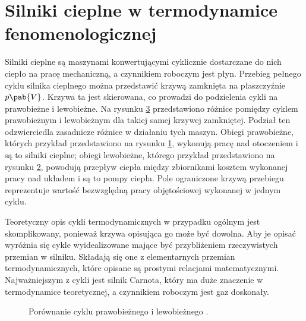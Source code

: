 
\section{Silniki cieplne w termodynamice fenomenologicznej}\label{sec:silniki_cieplne}
Silniki cieplne są maszynami konwertującymi cyklicznie dostarczane do nich ciepło na pracę mechaniczną, a czynnikiem roboczym jest płyn. Przebieg pełnego cyklu silnika cieplnego można przedstawić krzywą zamknięta na płaszczyźnie \(p\pab{V}\). Krzywa ta jest skierowana, co prowadzi do podzielenia cykli na prawobieżne i lewobieżne. Na rysunku \ref{fig:cykl_prawo_lewo} przedstawiono różnice pomiędzy cyklem prawobieżnym i lewobieżnym dla takiej samej krzywej zamkniętej. Podział ten odzwierciedla zasadnicze różnice w działaniu tych maszyn. Obiegi prawobieżne, których przykład przedstawiono na rysunku \ref{fig:cykl_prawobiezny}, wykonują pracę nad otoczeniem i są to silniki cieplne; obiegi lewobieżne, którego przykład przedstawiono na rysunku \ref{fig:cykl_lewobiezny}, powodują przepływ ciepła między zbiornikami kosztem wykonanej pracy nad układem i są to pompy ciepła. Pole ograniczone krzywą przebiegu reprezentuje wartość bezwzględną pracy objętościowej wykonanej w jednym cyklu.

Teoretyczny opis cykli termodynamicznych w przypadku ogólnym jest skomplikowany, ponieważ krzywa opisująca go może być dowolna. Aby je opisać wyróżnia się cykle wyidealizowane mające być przybliżeniem rzeczywistych przemian w silniku. Składają się one z elementarnych przemian termodynamicznych, które opisane są prostymi relacjami matematycznymi. Najważniejszym z cykli jest silnik Carnota, który ma duże znaczenie w termodynamice teoretycznej, a czynnikiem roboczym jest gaz doskonały.

\begin{figure}[H]
	\centering
	\begin{subfigure}{0.45\textwidth}
		\centering
		
		\caption{}
		\label{fig:cykl_prawobiezny}
	\end{subfigure}
	\begin{subfigure}{0.45\textwidth}
		\centering
		
		\caption{}
		\label{fig:cykl_lewobiezny}
	\end{subfigure}
	\captionsetup{subrefformat=parens}
	\caption{Porównanie cyklu prawobieżnego  i lewobieżnego .}
	\label{fig:cykl_prawo_lewo}
\end{figure}

